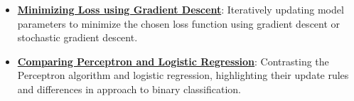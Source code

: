\documentclass{article}%
\begin{document}
\begin{itemize}[leftmargin=*]
\item \href{https://purdue.brightspace.com/d2l/common/assets/pdfjs-d2l-dist/1.0.14-legacy/web/viewer.html?file=%2Fcontent%2Fenforced%2F1095467-wl.202510.CS.24300.001%2F05L2-ML Basics.pdf%3Fou%3D1095467&lang=en-us&container=d2l-fileviewer-rendered-pdf&fullscreen=d2l-fileviewer-rendered-pdf-dialog&height=667#page=28}{\textbf{Minimizing Loss using Gradient Descent}}: Iteratively updating model parameters to minimize the chosen loss function using gradient descent or stochastic gradient descent.%
\item \href{https://purdue.brightspace.com/d2l/common/assets/pdfjs-d2l-dist/1.0.14-legacy/web/viewer.html?file=%2Fcontent%2Fenforced%2F1095467-wl.202510.CS.24300.001%2F05L2-ML Basics.pdf%3Fou%3D1095467&lang=en-us&container=d2l-fileviewer-rendered-pdf&fullscreen=d2l-fileviewer-rendered-pdf-dialog&height=667#page=33}{\textbf{Comparing Perceptron and Logistic Regression}}: Contrasting the Perceptron algorithm and logistic regression, highlighting their update rules and differences in approach to binary classification.%
\end{itemize}

%
\end{document}

